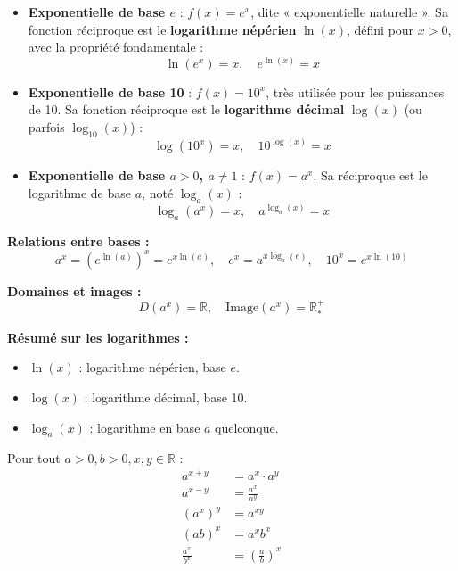 \documentclass[11pt,a4paper]{article}
\newcommand{\rulebox}[3]{
\begin{tcolorbox}[colback=#1!10!white,colframe=#1!60!black,title=\textbf{#2}]
#3
\end{tcolorbox}
}
\begin{document}
\rulebox{purple}{5. Fonctions exponentielles et logarithmes selon la base}{
\begin{itemize}
\item \textbf{Exponentielle de base $e$} : $f(x)=e^x$, dite « exponentielle naturelle ».  
    Sa fonction réciproque est le \textbf{logarithme népérien} $\ln(x)$, défini pour $x>0$, avec la propriété fondamentale :
    \[
    \ln(e^x)=x, \quad e^{\ln(x)}=x
    \]

\item \textbf{Exponentielle de base 10} : $f(x)=10^x$, très utilisée pour les puissances de 10.  
    Sa fonction réciproque est le \textbf{logarithme décimal} $\log(x)$ (ou parfois $\log_{10}(x)$) :
    \[
    \log(10^x)=x, \quad 10^{\log(x)}=x
    \]

\item \textbf{Exponentielle de base $a>0$, $a\neq 1$} : $f(x)=a^x$.  
    Sa réciproque est le logarithme de base $a$, noté $\log_a(x)$ :
    \[
    \log_a(a^x)=x, \quad a^{\log_a(x)}=x
    \]

\end{itemize}

\textbf{Relations entre bases :}
\[
a^x = (e^{\ln(a)})^x = e^{x\ln(a)}, \quad e^x = a^{x \log_a(e)}, \quad 10^x = e^{x\ln(10)}
\]

\textbf{Domaines et images :}
\[
D(a^x) = \mathbb{R}, \quad \text{Image}(a^x) = \mathbb{R}^+_*
\]

\textbf{Résumé sur les logarithmes :}
\begin{itemize}
\item $\ln(x)$ : logarithme népérien, base $e$.
\item $\log(x)$ : logarithme décimal, base 10.
\item $\log_a(x)$ : logarithme en base $a$ quelconque.
\end{itemize}
}




\rulebox{blue}{6. Propriétés générales des exponentielles}{
Pour tout $a>0, b>0, x,y\in\mathbb{R}$ :
\[
\begin{aligned}
a^{x+y} &= a^x \cdot a^y \\
a^{x-y} &= \frac{a^x}{a^y} \\
(a^x)^y &= a^{xy} \\
(ab)^x &= a^x b^x \\
\frac{a^x}{b^x} &= \left(\frac{a}{b}\right)^x
\end{aligned}
\]
}
\end{document}
